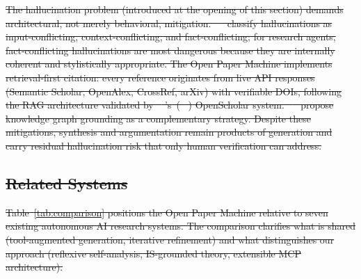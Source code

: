 \documentclass{article}
\providecommand{\DIFdeltex}[1]{{\protect\color{red}\sout{#1}}}                      %
\providecommand{\DIFdel}[1]{\texorpdfstring{\DIFdeltex{#1}}{}} %
\begin{document}
\DIFdel{The hallucination problem (introduced at the opening of this section) demands architectural, not merely behavioral, mitigation. \mbox{%
\citet{zhang2025hallucination} }\hskip0pt%
classify hallucinations as input-conflicting, context-conflicting, and fact-conflicting; for research agents, fact-conflicting hallucinations are most dangerous because they are internally coherent and stylistically appropriate. The Open Paper Machine implements retrieval-first citation: every reference originates from live API responses (Semantic Scholar, OpenAlex, CrossRef, arXiv) with verifiable DOIs, following the RAG architecture validated by \mbox{%
\citeauthor{asai2024openscholar}}\hskip0pt%
's~(\mbox{%
\citeyear{asai2024openscholar}}\hskip0pt%
) OpenScholar system. \mbox{%
\citet{guan2024knowledge} }\hskip0pt%
propose knowledge graph grounding as a complementary strategy. Despite these mitigations, synthesis and argumentation remain products of generation and carry residual hallucination risk that only human verification can address.
}%

\subsection{\DIFdel{Related Systems}}
\addtocounter{subsection}{-1}%

\DIFdel{Table~\ref{tab:comparison} positions the Open Paper Machine relative to seven existing autonomous AI research systems. The comparison clarifies what is shared (tool-augmented generation, iterative refinement) and what distinguishes our approach (reflexive self-analysis, IS-grounded theory, extensible MCP architecture).
}%
\end{document}
